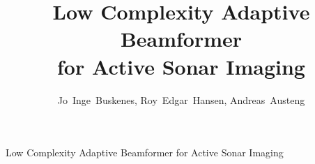 \documentclass[10pt,journal,draftclsnofoot,onecolumn]{IEEEtran}
\newcommand\1{\vec 1}
\begin{document}
\title{Low Complexity Adaptive Beamformer\\ for Active Sonar Imaging}

\author{Jo~Inge~Buskenes, %
        Roy~Edgar~Hansen, %
        Andreas~Austeng%

}

%
{Low Complexity Adaptive Beamformer for Active Sonar Imaging}


\end{document}
